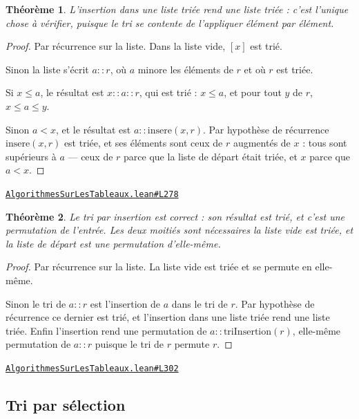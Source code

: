 \documentclass[11pt,a4paper]{article}
\theoremstyle{definition}
\theoremstyle{plain}
\newtheorem{theoreme}{Théorème}
\newcommand{\source}[2]{\par\smallskip\noindent\hfill{\footnotesize\href{#1}{\texttt{#2}}}\par\smallskip}
\begin{document}
\begin{theoreme}
L'insertion dans une liste triée rend une liste triée : c'est l'unique chose à
vérifier, puisque le tri se contente de l'appliquer élément par élément.
\end{theoreme}
\begin{proof}
Par récurrence sur la liste. Dans la liste vide, \([x]\) est trié.

Sinon la liste s'écrit \(a :: r\), où \(a\) minore les éléments de \(r\) et où \(r\) est
triée.

Si \(x \le a\), le résultat est \(x :: a :: r\), qui est trié : \(x \le a\), et pour
tout \(y\) de \(r\), \(x \le a \le y\).

Sinon \(a < x\), et le résultat est \(a :: \mathrm{insere}(x, r)\). Par hypothèse de
récurrence \(\mathrm{insere}(x, r)\) est triée, et ses éléments sont ceux de \(r\)
augmentés de \(x\) : tous sont supérieurs à \(a\) — ceux de \(r\) parce que la liste de
départ était triée, et \(x\) parce que \(a < x\).
\end{proof}
\source{https://github.com/Commutator-IO/learn-lean/blob/main/courses/02-lycee/11-informatique-nsi/AlgorithmesSurLesTableaux.lean\#L278}{AlgorithmesSurLesTableaux.lean\#L278}

\begin{theoreme}
Le tri par insertion est correct : son résultat est trié, et c'est une
permutation de l'entrée. Les deux moitiés sont nécessaires \textemdash{} la liste vide est triée,
et la liste de départ est une permutation d'elle-même.
\end{theoreme}
\begin{proof}
Par récurrence sur la liste. La liste vide est triée et se permute en elle-même.

Sinon le tri de \(a :: r\) est l'insertion de \(a\) dans le tri de \(r\). Par hypothèse
de récurrence ce dernier est trié, et l'insertion dans une liste triée rend une liste
triée. Enfin l'insertion rend une permutation de \(a :: \mathrm{triInsertion}(r)\),
elle-même permutation de \(a :: r\) puisque le tri de \(r\) permute \(r\).
\end{proof}
\source{https://github.com/Commutator-IO/learn-lean/blob/main/courses/02-lycee/11-informatique-nsi/AlgorithmesSurLesTableaux.lean\#L302}{AlgorithmesSurLesTableaux.lean\#L302}

\subsection{Tri par sélection}
\end{document}
